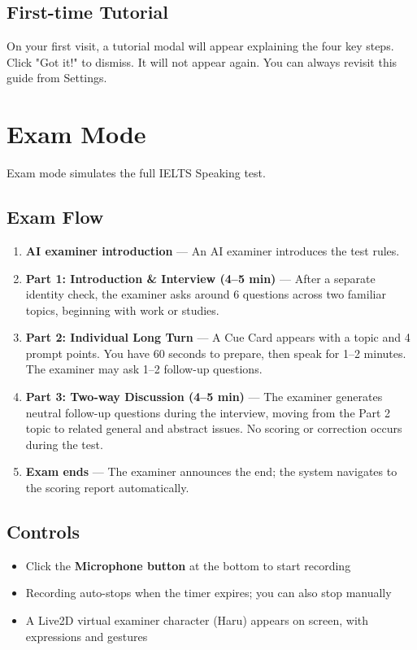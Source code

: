 \documentclass[12pt,a4paper]{article}
\begin{document}
\subsection{First-time Tutorial}

On your first visit, a tutorial modal will appear explaining the four key steps. Click "Got it!" to dismiss. It will not appear again. You can always revisit this guide from Settings.

\newpage

\section{Exam Mode}

Exam mode simulates the full IELTS Speaking test.

\subsection{Exam Flow}

\begin{enumerate}[leftmargin=*]
  \item \textbf{AI examiner introduction} --- An AI examiner introduces the test rules.
  \item \textbf{Part 1: Introduction \& Interview (4--5 min)} --- After a separate identity check, the examiner asks around 6 questions across two familiar topics, beginning with work or studies.
  \item \textbf{Part 2: Individual Long Turn} --- A Cue Card appears with a topic and 4 prompt points. You have 60 seconds to prepare, then speak for 1--2 minutes. The examiner may ask 1--2 follow-up questions.
  \item \textbf{Part 3: Two-way Discussion (4--5 min)} --- The examiner generates neutral follow-up questions during the interview, moving from the Part 2 topic to related general and abstract issues. No scoring or correction occurs during the test.
  \item \textbf{Exam ends} --- The examiner announces the end; the system navigates to the scoring report automatically.
\end{enumerate}

\subsection{Controls}

\begin{itemize}[leftmargin=*]
  \item Click the \textbf{Microphone button} at the bottom to start recording
  \item Recording auto-stops when the timer expires; you can also stop manually
  \item A Live2D virtual examiner character (Haru) appears on screen, with expressions and gestures
\end{itemize}
\end{document}
